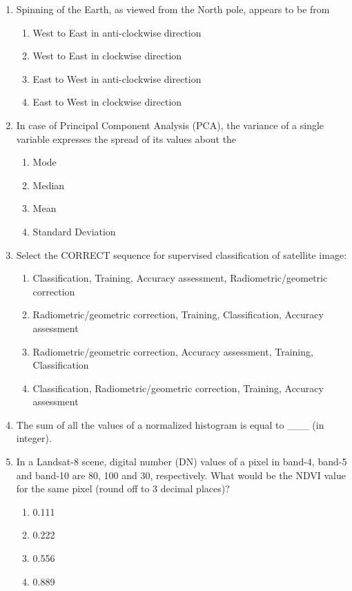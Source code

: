 \documentclass[12pt,a4paper]{article}
\begin{document}
\begin{enumerate}
\item Spinning of the Earth, as viewed from the North pole, appears to be from
\begin{enumerate}
    \item West to East in anti-clockwise direction
    \item West to East in clockwise direction
    \item East to West in anti-clockwise direction
    \item East to West in clockwise direction
\end{enumerate}

\item In case of Principal Component Analysis (PCA), the variance of a single variable expresses the spread of its values about the
\begin{enumerate}
    \item Mode
    \item Median
    \item Mean
    \item Standard Deviation
\end{enumerate}

\item Select the CORRECT sequence for supervised classification of satellite image:
\begin{enumerate}
    \item Classification, Training, Accuracy assessment, Radiometric/geometric correction
    \item Radiometric/geometric correction, Training, Classification, Accuracy assessment
    \item Radiometric/geometric correction, Accuracy assessment, Training, Classification
    \item Classification, Radiometric/geometric correction, Training, Accuracy assessment
\end{enumerate}

\item The sum of all the values of a normalized histogram is equal to \_\_\_ (in integer).

\item In a Landsat-8 scene, digital number (DN) values of a pixel in band-4, band-5 and band-10 are 80, 100 and 30, respectively. What would be the NDVI value for the same pixel (round off to 3 decimal places)?
\begin{enumerate}
    \item 0.111
    \item 0.222
    \item 0.556
    \item 0.889
\end{enumerate}


\end{enumerate}
\end{document}

